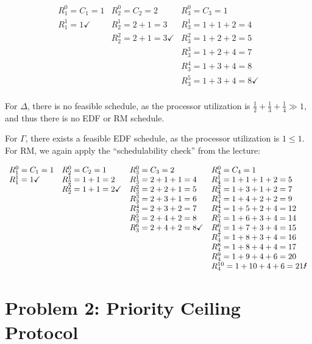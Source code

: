 \documentclass[a4paper,parskip,headheight=38pt]{scrartcl} %
\begin{document}
\[\begin{array}{lll}
R_1^0 = C_1 = 1 & R_2^0 = C_2 = 2 & R_3^0 = C_3 = 1 \\
R_1^1 = 1 \checkmark & R_2^1 = 2 + 1 = 3 & R_3^1 = 1 + 1 + 2 = 4 \\
& R_2^2 = 2 + 1 = 3 \checkmark & R_3^2 = 1 + 2 + 2 = 5 \\
& & R_3^3 = 1 + 2 + 4 = 7 \\
& & R_3^4 = 1 + 3 + 4 = 8 \\
& & R_3^5 = 1 + 3 + 4 = 8 \checkmark \\
\end{array}\]

For $\Delta$, there is no feasible schedule, as the processor
utilization is $\frac{1}{2}+\frac{1}{3}+\frac{1}{4} \gg 1$, and thus
there is no EDF or RM schedule.

For $\Gamma$, there exists a feasible EDF schedule, as the processor
utilization is $1 \leq 1$.  For RM, we again apply the
\enquote{schedulability check} from the lecture:

\[\begin{array}{llll}
R_1^0 = C_1 = 1 & R_2^0 = C_2 = 1 & R_3^0 = C_3 = 2 & R_4^0 = C_4 = 1 \\
R_1^1 = 1\checkmark & R_2^1 = 1 + 1 = 2 & R_3^1 = 2 + 1 + 1 = 4 & R_4^1 = 1 + 1 + 1 + 2 = 5 \\
& R_2^2 = 1 + 1 = 2\checkmark & R_3^2 = 2 + 2 + 1 = 5 & R_4^2 = 1 + 3 + 1 + 2 = 7 \\
& & R_3^3 = 2 + 3 + 1 = 6 & R_4^3 = 1 + 4 + 2 + 2 = 9 \\
& & R_3^4 = 2 + 3 + 2 = 7 & R_4^4 = 1 + 5 + 2 + 4 = 12 \\
& & R_3^5 = 2 + 4 + 2 = 8 & R_4^5 = 1 + 6 + 3 + 4 = 14 \\
& & R_3^6 = 2 + 4 + 2 = 8\checkmark & R_4^6 = 1 + 7 + 3 + 4 = 15 \\
& & & R_4^7 = 1 + 8 + 3 + 4 = 16 \\
& & & R_4^8 = 1 + 8 + 4 + 4 = 17 \\
& & & R_4^9 = 1 + 9 + 4 + 6 = 20 \\
& & & R_4^{10} = 1 + 10 + 4 + 6 = 21 \text{\Lightning}
\end{array}\]


\section*{Problem 2: Priority Ceiling Protocol}
\end{document}
